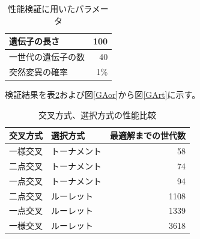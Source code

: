 \documentclass{jsarticle}
\begin{document}
\begin{table}[H]
	\caption{性能検証に用いたパラメータ\label{GA_params}}
	\begin{center}
		\begin{tabular}{|l|r|} \hline
			遺伝子の長さ & 100 \\ \hline
			一世代の遺伝子の数 & 40 \\ \hline
			突然変異の確率 & 1\% \\ \hline
		\end{tabular}
	\end{center}
\end{table}

検証結果を表\ref{GA_compare}および図\ref{GAor}から図\ref{GArt}に示す。

\begin{table}[H]
	\caption{交叉方式、選択方式の性能比較\label{GA_compare}}
	\begin{center}
		\begin{tabular}{|l|l|r|} \hline
			交叉方式 & 選択方式 & 最適解までの世代数 \\ \hline\hline
			一様交叉 & トーナメント & 58 \\ \hline
			二点交叉 & トーナメント & 74 \\ \hline
			一点交叉 & トーナメント & 94 \\ \hline
			二点交叉 & ルーレット & 1108 \\ \hline
			一点交叉 & ルーレット & 1339 \\ \hline
			一様交叉 & ルーレット & 3618 \\ \hline
		\end{tabular}
	\end{center}
\end{table}
\end{document}
